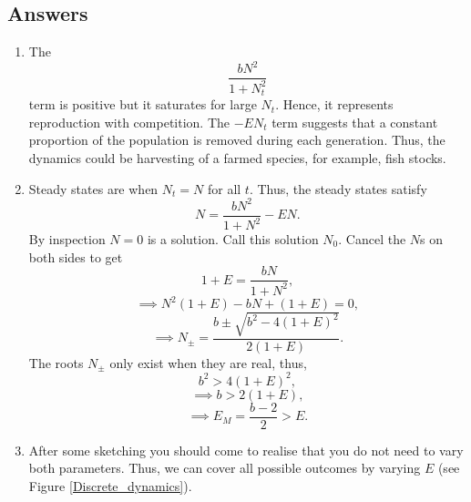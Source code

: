 \documentclass[10pt]{article}
\newcommand{\bb}{\begin{equation}}
\newcommand{\ee}{\end{equation}}
\newcommand{\see}[1]{(see Figure \ref{#1})}
\begin{document}
\begin{Answ}
\subsection{Answers}
\begin{enumerate}
\item The
\bb
\frac{bN^2}{1+N_t^2}
\ee
term is positive but it saturates for large $N_t$. Hence, it represents reproduction with competition. The $-EN_t$ term  suggests that a constant proportion of the population is removed during each generation. Thus, the dynamics could be harvesting of a farmed species, for example, fish stocks.
\item Steady states are when $N_t=N$ for all $t$. Thus, the steady states satisfy
\bb
N=\frac{bN^2}{1+N^2}-EN.\nonumber
\ee
By inspection $N=0$ is a solution. Call this solution $N_0$. Cancel the $N$s on both sides to get
\bb
1+E=\frac{bN}{1+N^2},\nonumber
\ee
\bb
\implies N^2(1+E)-bN+(1+E)=0,\nonumber
\ee
\bb
\implies N_\pm=\frac{b\pm\sqrt{b^2-4(1+E)^2}}{2(1+E)}.\nonumber
\ee
The roots $N_\pm$ only exist when they are real, thus,
\bb
b^2>4(1+E)^2,\nonumber
\ee
\bb
\implies b>2(1+E),\nonumber
\ee
\bb
\implies E_M=\frac{b-2}{2}>E.
\ee
\item After some sketching you should come to realise that you do not need to vary both parameters. Thus, we can cover all possible outcomes by varying $E$ \see{Discrete_dynamics}.


\end{enumerate}
\end{Answ}
\end{document}
